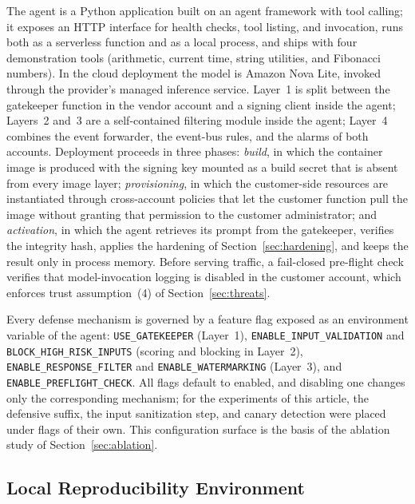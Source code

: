 The agent is a Python application built on an agent framework with tool calling; it exposes an HTTP interface for health checks, tool listing, and invocation, runs both as a serverless function and as a local process, and ships with four demonstration tools (arithmetic, current time, string utilities, and Fibonacci numbers). In the cloud deployment the model is Amazon Nova Lite, invoked through the provider's managed inference service. Layer~1 is split between the gatekeeper function in the vendor account and a signing client inside the agent; Layers~2 and~3 are a self-contained filtering module inside the agent; Layer~4 combines the event forwarder, the event-bus rules, and the alarms of both accounts. Deployment proceeds in three phases: \emph{build}, in which the container image is produced with the signing key mounted as a build secret that is absent from every image layer; \emph{provisioning}, in which the customer-side resources are instantiated through cross-account policies that let the customer function pull the image without granting that permission to the customer administrator; and \emph{activation}, in which the agent retrieves its prompt from the gatekeeper, verifies the integrity hash, applies the hardening of Section~\ref{sec:hardening}, and keeps the result only in process memory. Before serving traffic, a fail-closed pre-flight check verifies that model-invocation logging is disabled in the customer account, which enforces trust assumption~(4) of Section~\ref{sec:threats}.

Every defense mechanism is governed by a feature flag exposed as an environment variable of the agent: \texttt{USE\_GATEKEEPER} (Layer~1), \texttt{ENABLE\_INPUT\_VALIDATION} and \texttt{BLOCK\_HIGH\_RISK\_INPUTS} (scoring and blocking in Layer~2), \texttt{ENABLE\_RESPONSE\_FILTER} and \texttt{ENABLE\_WATERMARKING} (Layer~3), and \texttt{ENABLE\_PREFLIGHT\_CHECK}. All flags default to enabled, and disabling one changes only the corresponding mechanism; for the experiments of this article, the defensive suffix, the input sanitization step, and canary detection were placed under flags of their own. This configuration surface is the basis of the ablation study of Section~\ref{sec:ablation}.

\subsection{Local Reproducibility Environment}
\label{sec:local-env}

